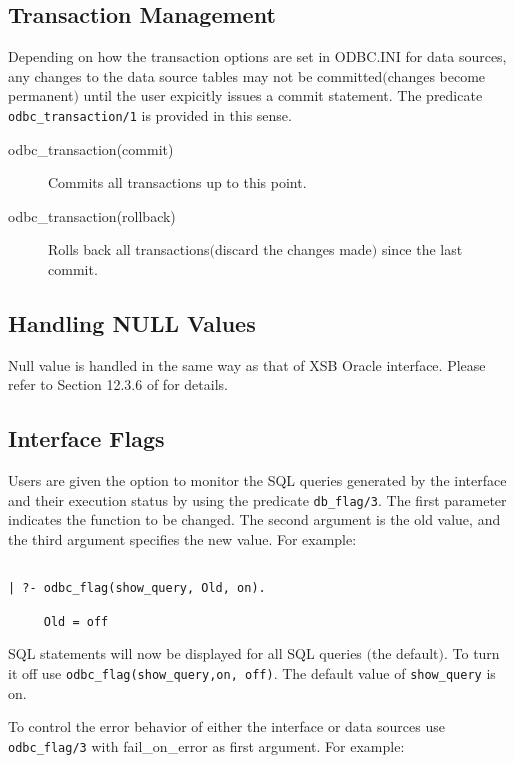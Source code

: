 \subsection{Transaction Management}\label{TransactionManagement}
Depending on how the transaction options are set in ODBC.INI for data sources, 
any changes to the data source tables may not be committed$($changes become 
permanent$)$  until the user expicitly issues a commit statement. 
The predicate {\tt odbc\_transaction/1} is provided in this sense. 
\begin{description}
\item[odbc\_transaction(commit)]
	Commits all transactions up to this point.
\item[odbc\_transaction(rollback)]
	Rolls back all transactions$($discard the changes made$)$  since 
the last commit.
\end{description}

\subsection{Handling NULL Values}
Null value is handled in the same way as that of XSB Oracle interface.
Please refer to Section 12.3.6 of \cite{xsb-manual} for details.

\subsection{Interface Flags}

Users are given the option to monitor the SQL queries generated 
by the interface and their execution status by using the 
predicate {\tt db\_flag/3}.  The first parameter indicates the function  to be
changed.  The second argument is the old value, and the third argument specifies
the new value.  For example:
\begin{verbatim}

| ?- odbc_flag(show_query, Old, on).

     Old = off
\end{verbatim}

SQL statements will now be displayed for all SQL queries $($the default$)$.
To turn it off use {\tt odbc\_flag(show\_query,on, off)}.  The default value 
of {\tt show\_query} is on.

To control the error behavior of either the interface or
data sources use {\tt odbc\_flag/3} with fail\_on\_error as first argument.
For example:

